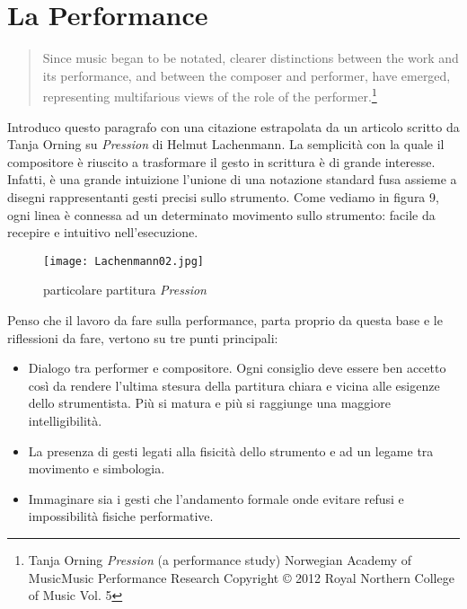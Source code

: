 
\chapter{La Performance}
\label{chp:La Performance}

\begin{quotation}
Since music began to be notated, clearer distinctions between the work and its performance, and between the composer and performer, have emerged, representing multifarious views of the role of the performer.\footnote{Tanja Orning \textit{Pression} (a performance study) Norwegian Academy of MusicMusic Performance Research Copyright © 2012 Royal Northern College of Music Vol. 5}
\end{quotation}

Introduco questo paragrafo con una citazione estrapolata da un articolo scritto da Tanja Orning su \textit{Pression} di Helmut Lachenmann. La semplicità con la quale il compositore è riuscito a trasformare il gesto in scrittura è di grande interesse. Infatti, è una grande intuizione l'unione di una notazione standard fusa assieme a disegni rappresentanti gesti precisi sullo strumento. Come vediamo in figura 9, ogni linea è connessa ad un determinato movimento sullo strumento: facile da recepire e intuitivo nell'esecuzione. 

\begin{figure}[!h]
\centering
\texttt{[image: Lachenmann02.jpg]}
\caption{particolare partitura \textit{Pression}}
\end{figure}

Penso che il lavoro da fare sulla performance, parta proprio da questa base e le riflessioni da fare, vertono su tre punti principali:
\begin{itemize}
\item{Dialogo tra performer e compositore. Ogni consiglio deve essere ben accetto così da rendere l'ultima stesura della partitura chiara e vicina alle esigenze dello strumentista. Più si matura e più si raggiunge una maggiore intelligibilità.}
\item{La presenza di gesti legati alla fisicità dello strumento e ad un legame tra movimento e simbologia.}
\item{Immaginare sia i gesti che l'andamento formale onde evitare refusi e impossibilità fisiche performative.}
\end{itemize}

